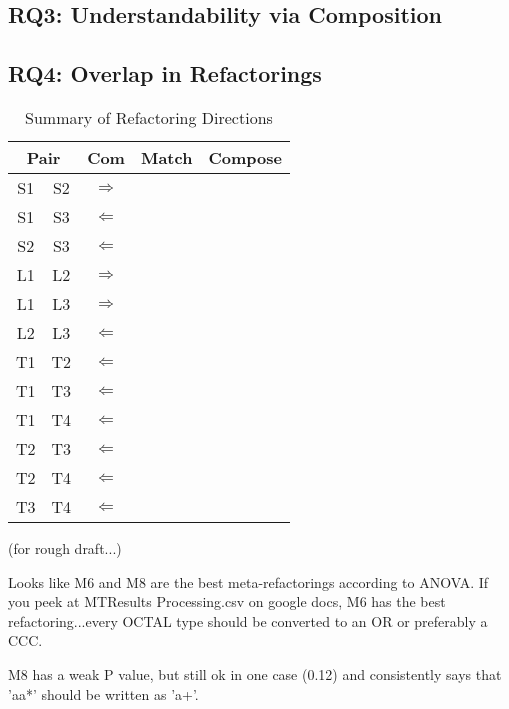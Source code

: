 \subsection{RQ3: Understandability via Composition}

\subsection{RQ4: Overlap in Refactorings}

\begin{table}
\caption{Summary of Refactoring Directions \label{summaryResults}}
\begin{center}
\begin{tabular}{|cc | c c c|} \hline
\multicolumn{2}{|c|}{\textbf{Pair}} & \textbf{Com} & \textbf{Match} & \textbf{Compose} \\ \hline \hline
S1 & S2 & $\Rightarrow$ & & \\
S1 & S3 & $\Leftarrow$ & & \\
S2 & S3 & $\Leftarrow$ & & \\
\hline 
L1 & L2 & $\Rightarrow$ & & \\
L1 & L3 & $\Rightarrow$ & & \\
L2 & L3 & $\Leftarrow$ & & \\
\hline
T1 & T2 & $\Leftarrow$  & & \\
T1 & T3 & $\Leftarrow$ & & \\
T1 & T4 & $\Leftarrow$ & & \\
T2 & T3 & $\Leftarrow$ & & \\
T2 & T4 & $\Leftarrow$ & & \\
T3 & T4 & $\Leftarrow$ & & \\
\hline


\end{tabular}
\end{center}
\end{table}


(for rough draft...)

Looks like M6 and M8 are the best meta-refactorings according to ANOVA.
If you peek at MTResults Processing.csv on google docs, M6 has the best refactoring...every OCTAL type should be converted to an OR or preferably a CCC.

M8 has a weak P value, but still ok in one case (0.12) and consistently says that 'aa*' should be written as 'a+'.


